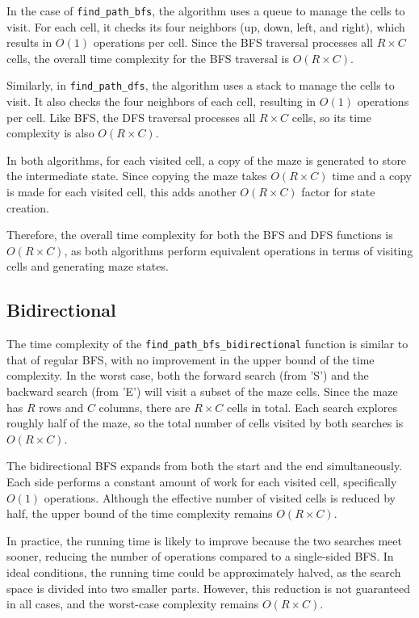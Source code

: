 \documentclass[final, journal, 11pt]{report}
\begin{document}
	In the case of \texttt{find\_path\_bfs}, the algorithm uses a queue to manage the cells to visit. For each cell, it checks its four neighbors (up, down, left, and right), which results in \( O(1) \) operations per cell. Since the BFS traversal processes all \( R \times C \) cells, the overall time complexity for the BFS traversal is \( O(R \times C) \).
	
	Similarly, in \texttt{find\_path\_dfs}, the algorithm uses a stack to manage the cells to visit. It also checks the four neighbors of each cell, resulting in \( O(1) \) operations per cell. Like BFS, the DFS traversal processes all \( R \times C \) cells, so its time complexity is also \( O(R \times C) \).
	
	In both algorithms, for each visited cell, a copy of the maze is generated to store the intermediate state. Since copying the maze takes \( O(R \times C) \) time and a copy is made for each visited cell, this adds another \( O(R \times C) \) factor for state creation.
	
	Therefore, the overall time complexity for both the BFS and DFS functions is \( O(R \times C) \), as both algorithms perform equivalent operations in terms of visiting cells and generating maze states.
	
	\subsection*{Bidirectional}
	The time complexity of the \texttt{find\_path\_bfs\_bidirectional} function is similar to that of regular BFS, with no improvement in the upper bound of the time complexity. In the worst case, both the forward search (from 'S') and the backward search (from 'E') will visit a subset of the maze cells. Since the maze has \( R \) rows and \( C \) columns, there are \( R \times C \) cells in total. Each search explores roughly half of the maze, so the total number of cells visited by both searches is \( O(R \times C) \).
	
	The bidirectional BFS expands from both the start and the end simultaneously. Each side performs a constant amount of work for each visited cell, specifically \( O(1) \) operations. Although the effective number of visited cells is reduced by half, the upper bound of the time complexity remains \( O(R \times C) \).
	
	In practice, the running time is likely to improve because the two searches meet sooner, reducing the number of operations compared to a single-sided BFS. In ideal conditions, the running time could be approximately halved, as the search space is divided into two smaller parts. However, this reduction is not guaranteed in all cases, and the worst-case complexity remains \( O(R \times C) \).
	
\end{document}
